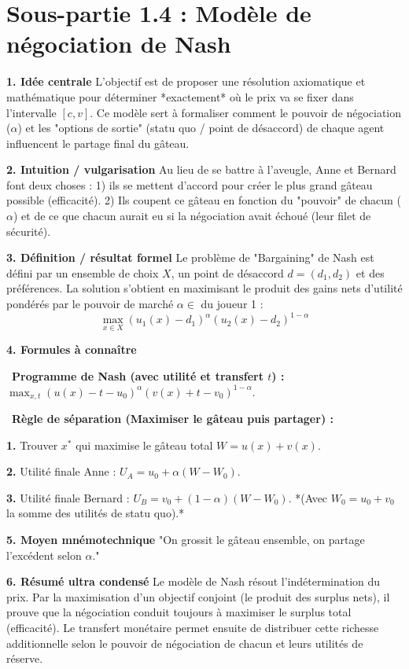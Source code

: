 \documentclass[11pt, a4paper]{report}
\begin{document}
\section{Sous-partie 1.4 : Modèle de négociation de Nash}

\textbf{1. Idée centrale}
L'objectif est de proposer une résolution axiomatique et mathématique pour déterminer *exactement* où le prix va se fixer dans l'intervalle $[c, v]$. Ce modèle sert à formaliser comment le pouvoir de négociation ($\alpha$) et les "options de sortie" (statu quo / point de désaccord) de chaque agent influencent le partage final du gâteau. 

\textbf{2. Intuition / vulgarisation}
Au lieu de se battre à l'aveugle, Anne et Bernard font deux choses : 1) ils se mettent d'accord pour créer le plus grand gâteau possible (efficacité). 2) Ils coupent ce gâteau en fonction du "pouvoir" de chacun ($\alpha$) et de ce que chacun aurait eu si la négociation avait échoué (leur filet de sécurité). 

\textbf{3. Définition / résultat formel}
Le problème de "Bargaining" de Nash est défini par un ensemble de choix $X$, un point de désaccord $d = (d_1, d_2)$ et des préférences. La solution s'obtient en maximisant le produit des gains nets d'utilité pondérés par le pouvoir de marché $\alpha \in$ du joueur 1 :
$$ \max_{x \in X} (u_1(x) - d_1)^\alpha (u_2(x) - d_2)^{1-\alpha} $$

\textbf{4. Formules à connaître}
\par \textbullet\ \textbf{Programme de Nash (avec utilité et transfert $t$) :} $\max_{x, t} (u(x) - t - u_0)^\alpha (v(x) + t - v_0)^{1-\alpha}$.
\par \textbullet\ \textbf{Règle de séparation (Maximiser le gâteau puis partager) :} 
\par \textbf{1.} Trouver $x^*$ qui maximise le gâteau total $W = u(x) + v(x)$.
\par \textbf{2.} Utilité finale Anne : $U_A = u_0 + \alpha(W - W_0)$.
\par \textbf{3.} Utilité finale Bernard : $U_B = v_0 + (1-\alpha)(W - W_0)$.
    *(Avec $W_0 = u_0 + v_0$ la somme des utilités de statu quo).*

\textbf{5. Moyen mnémotechnique}
"On grossit le gâteau ensemble, on partage l'excédent selon $\alpha$."

\textbf{6. Résumé ultra condensé}
Le modèle de Nash résout l'indétermination du prix. Par la maximisation d'un objectif conjoint (le produit des surplus nets), il prouve que la négociation conduit toujours à maximiser le surplus total (efficacité). Le transfert monétaire permet ensuite de distribuer cette richesse additionnelle selon le pouvoir de négociation de chacun et leurs utilités de réserve.
\end{document}
